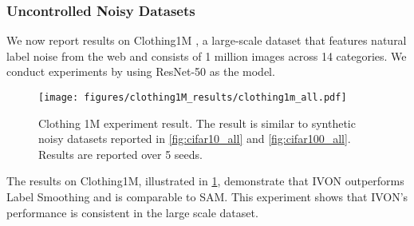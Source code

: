 \subsubsection{Uncontrolled Noisy Datasets}
We now report results on Clothing1M \citep{xiao2015learning}, a large-scale dataset that features natural label noise from the web and consists of 1 million images across 14 categories. We conduct experiments by using ResNet-50 as the model. 

\begin{figure}[h]
	\centering
	\texttt{[image: figures/clothing1M\_results/clothing1m\_all.pdf]}
	\caption{ Clothing 1M experiment result. The result is similar to synthetic noisy datasets reported in \cref{fig:cifar10_all} and \cref{fig:cifar100_all}. Results are reported over 5 seeds.}
	\label{fig: clothing1m_all}
\end{figure}

The results on Clothing1M, illustrated in \cref{fig: clothing1m_all}, demonstrate that IVON outperforms Label Smoothing and is comparable to SAM. This experiment shows that IVON's performance is consistent in the large scale dataset. 

